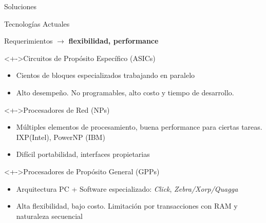 \documentclass[xcolor=dvipsnames]{beamer}
\begin{document}
\begin{frame}{Soluciones}
\end{frame}  
  
   
\begin {frame}{Tecnologías Actuales}   
  
  Requerimientos $\rightarrow$ {\bf flexibilidad, performance} 
  
  \begin{block}<+->{Circuitos de Propósito Específico (ASICs)} 
    \begin{itemize}
      \scriptsize
      \item Cientos de bloques especializados trabajando en paralelo
      \item Alto desempeño. No programables, alto costo y tiempo de desarrollo.
    \end{itemize}
  \end{block}

  \begin{block}<+->{Procesadores de Red (NPs)}   
    \begin{itemize}
      \scriptsize
      \item Múltiples elementos de procesamiento, buena performance para ciertas tareas. IXP(Intel), PowerNP (IBM)
      \item Difícil portabilidad, interfaces propietarias
    \end{itemize}
  \end{block}

  \begin{block}<+->{Procesadores de Propósito General (GPPs)} 
    \begin{itemize}
      \scriptsize
      \item Arquitectura PC + Software especializado: \emph{Click}, \emph{Zebra/Xorp/Quagga}
      \item Alta flexibilidad, bajo costo. Limitación por transacciones con RAM y naturaleza secuencial
    \end{itemize}
  \end{block}
  
\end{frame}
\end{document}
